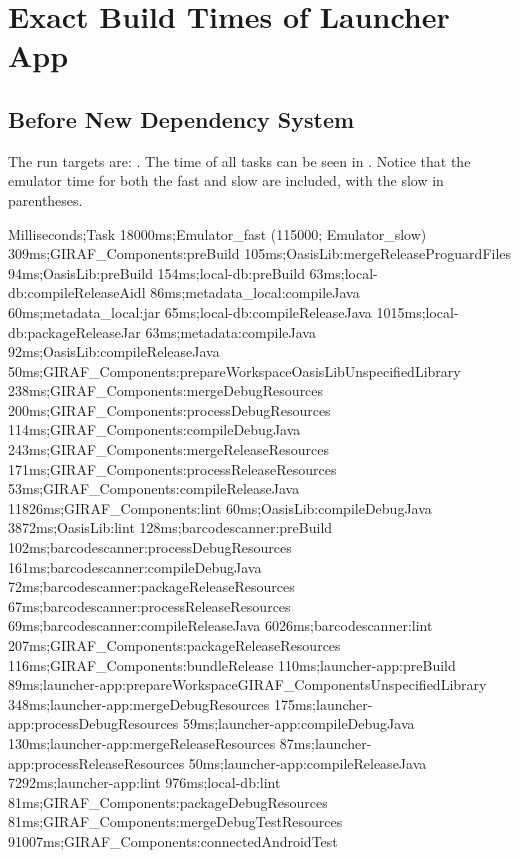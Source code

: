 \chapter{Exact Build Times of Launcher App}
\label{app:build_times}

\section{Before New Dependency System}
The run targets are: . The time of all tasks can be seen in . Notice that the emulator time for both the fast and slow are included, with the slow in parentheses.

\begin{gradlecode}[caption=Running time of tasks of old dependency system,label=lst:full_data_old_dep_system]
Milliseconds;Task
18000ms;Emulator_fast
(115000; Emulator_slow)
309ms;GIRAF_Components:preBuild
105ms;OasisLib:mergeReleaseProguardFiles
94ms;OasisLib:preBuild
154ms;local-db:preBuild
63ms;local-db:compileReleaseAidl
86ms;metadata_local:compileJava
60ms;metadata_local:jar
65ms;local-db:compileReleaseJava
1015ms;local-db:packageReleaseJar
63ms;metadata:compileJava
92ms;OasisLib:compileReleaseJava
50ms;GIRAF_Components:prepareWorkspaceOasisLibUnspecifiedLibrary
238ms;GIRAF_Components:mergeDebugResources
200ms;GIRAF_Components:processDebugResources
114ms;GIRAF_Components:compileDebugJava
243ms;GIRAF_Components:mergeReleaseResources
171ms;GIRAF_Components:processReleaseResources
53ms;GIRAF_Components:compileReleaseJava
11826ms;GIRAF_Components:lint
60ms;OasisLib:compileDebugJava
3872ms;OasisLib:lint
128ms;barcodescanner:preBuild
102ms;barcodescanner:processDebugResources
161ms;barcodescanner:compileDebugJava
72ms;barcodescanner:packageReleaseResources
67ms;barcodescanner:processReleaseResources
69ms;barcodescanner:compileReleaseJava
6026ms;barcodescanner:lint
207ms;GIRAF_Components:packageReleaseResources
116ms;GIRAF_Components:bundleRelease
110ms;launcher-app:preBuild
89ms;launcher-app:prepareWorkspaceGIRAF_ComponentsUnspecifiedLibrary
348ms;launcher-app:mergeDebugResources
175ms;launcher-app:processDebugResources
59ms;launcher-app:compileDebugJava
130ms;launcher-app:mergeReleaseResources
87ms;launcher-app:processReleaseResources
50ms;launcher-app:compileReleaseJava
7292ms;launcher-app:lint
976ms;local-db:lint
81ms;GIRAF_Components:packageDebugResources
81ms;GIRAF_Components:mergeDebugTestResources
91007ms;GIRAF_Components:connectedAndroidTest

\end{gradlecode}
